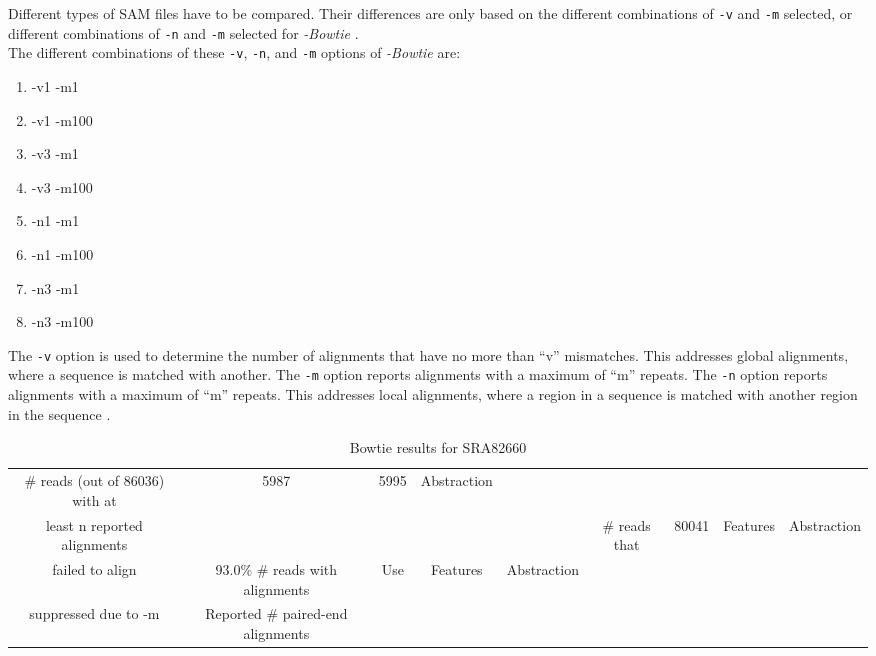 \documentclass[letter,12pt]{article}
\begin{document}
Different types of SAM files have to be compared. Their differences are only based on the different combinations of {\tt -v} and {\tt -m} selected, or different combinations of {\tt -n} and {\tt -m} selected for {\it -Bowtie} \cite{Langmead2014}. \\

The different combinations of these {\tt -v}, {\tt -n}, and {\tt -m} options of {\it -Bowtie} are: \vspace{-0.3cm}
\begin{enumerate} \itemsep -4pt
\item -v1 -m1
\item -v1 -m100
\item -v3 -m1
\item -v3 -m100
\item -n1 -m1
\item -n1 -m100
\item -n3 -m1
\item -n3 -m100
\end{enumerate}

The {\tt -v} option is used to determine the number of alignments that have no more than ``v'' mismatches. This addresses global alignments, where a sequence is matched with another. The {\tt -m} option reports alignments with a maximum of ``m'' repeats. The {\tt -n} option reports alignments with a maximum of ``m'' repeats. This addresses local alignments, where a region in a sequence is matched with another region in the sequence \cite{Aramayo2014}.

\begin{table}[htdp]
\caption{Bowtie results for SRA82660}	\vspace{-0.2in}
\label{tab:bowtie}
	\begin{center}
		\begin{tabular}{|c|c|c|c|c|c|c|c|c|}
		\hline
		\# reads (out of 86036) with at & 5987 & 5995 & Abstraction \\
		least n reported alignments & & & & &
		\hline
		\# reads that & 80041 & Features & Abstraction \\
		failed to align & 93.0\%
		\hline
		\# reads with alignments  & Use & Features & Abstraction \\
		suppressed due to -m & 
		\hline
		Reported \# paired-end alignments & 
		\hline
		\end{tabular}
	\end{center}
\end{table}
\end{document}
